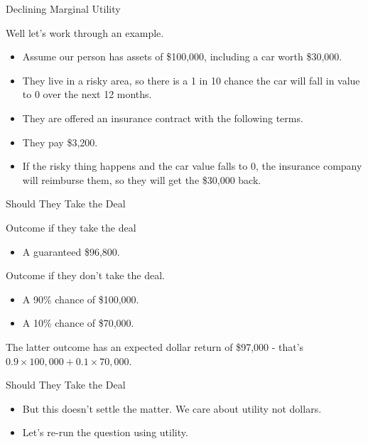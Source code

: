 \documentclass[
  ignorenonframetext,
]{beamer}
\providecommand{\tightlist}{%
  \setlength{\itemsep}{0pt}\setlength{\parskip}{0pt}}
\renewcommand{\,}{\text{, }}
\begin{document}
\begin{frame}{Declining Marginal Utility}
\protect\hypertarget{declining-marginal-utility}{}

Well let's work through an example.

\begin{itemize}
\tightlist
\item
  Assume our person has assets of \$100,000, including a car worth
  \$30,000.
\item
  They live in a risky area, so there is a 1 in 10 chance the car will
  fall in value to 0 over the next 12 months.
\item
  They are offered an insurance contract with the following terms.
\item
  They pay \$3,200.
\item
  If the risky thing happens and the car value falls to 0, the insurance
  company will reimburse them, so they will get the \$30,000 back.
\end{itemize}

\end{frame}

\begin{frame}{Should They Take the Deal}
\protect\hypertarget{should-they-take-the-deal}{}

Outcome if they take the deal

\begin{itemize}
\tightlist
\item
  A guaranteed \$96,800. \pause
\end{itemize}

Outcome if they don't take the deal.

\begin{itemize}
\tightlist
\item
  A 90\% chance of \$100,000.
\item
  A 10\% chance of \$70,000. \pause
\end{itemize}

The latter outcome has an expected dollar return of \$97,000 - that's
\(0.9 \times 100,000 + 0.1 \times 70,000\).

\end{frame}

\begin{frame}{Should They Take the Deal}
\protect\hypertarget{should-they-take-the-deal-1}{}

\begin{itemize}
\tightlist
\item
  But this doesn't settle the matter. We care about utility not dollars.
\item
  Let's re-run the question using utility.
\end{itemize}

\end{frame}
\end{document}
